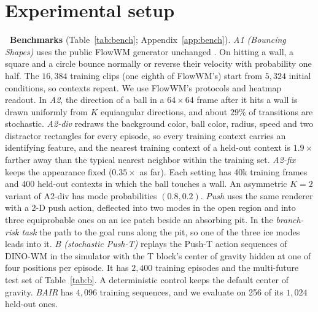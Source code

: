 \section{Experimental setup}
\label{sec:setup}
\leavevmode{}\textbf{\thesubsection\ Benchmarks} (Table~\ref{tab:bench}; Appendix~\ref{app:bench}). \emph{A1 (Bouncing Shapes)} uses the public FlowWM generator unchanged \citep{porcher2026flowwm}. On hitting a wall, a square and a circle bounce normally or reverse their velocity with probability one half. The $16{,}384$ training clips (one eighth of FlowWM's) start from $5{,}324$ initial conditions, so contexts repeat. We use FlowWM's protocols and heatmap readout. In \emph{A2}, the direction of a ball in a $64\times64$ frame after it hits a wall is drawn uniformly from $K$ equiangular directions, and about $29\%$ of transitions are stochastic. \emph{A2-div} redraws the background color, ball color, radius, speed and two distractor rectangles for every episode, so every training context carries an identifying feature, and the nearest training context of a held-out context is $1.9\times$ farther away than the typical nearest neighbor within the training set. \emph{A2-fix} keeps the appearance fixed ($0.35\times$ as far). Each setting has 40k training frames and 400 held-out contexts in which the ball touches a wall. An asymmetric $K{=}2$ variant of A2-div has mode probabilities $(0.8, 0.2)$. \emph{Push} uses the same renderer with a 2-D push action, deflected into two modes in the open region and into three equiprobable ones on an ice patch beside an absorbing pit. In the \emph{branch-risk task} the path to the goal runs along the pit, so one of the three ice modes leads into it. \emph{B (stochastic Push-T)} replays the Push-T action sequences of DINO-WM \citep{zhou2025dinowm} in the simulator with the T block's center of gravity hidden at one of four positions per episode. It has $2{,}400$ training episodes and the multi-future test set of Table~\ref{tab:b}. A deterministic control keeps the default center of gravity. \emph{BAIR} has $4{,}096$ training sequences, and we evaluate on 256 of its $1{,}024$ held-out ones.

